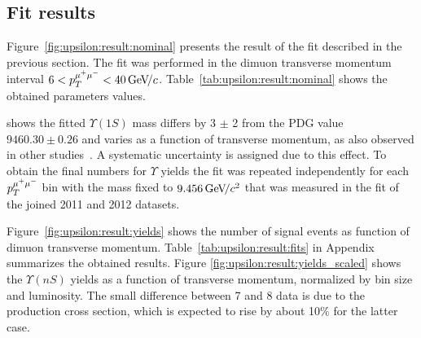\subsection{Fit results}
\label{sec:upsilon:result}

Figure~\ref{fig:upsilon:result:nominal} presents the result of the fit 
described in the previous section. The fit was performed in the dimuon
transverse momentum interval $ 6 < p_T^{{\mu^+\mu^-}} < 40 {\mathrm{\,Ge\kern -0.1em V\!/}c}$.
Table~\ref{tab:upsilon:result:nominal} shows the obtained parameters values. 







% 


 shows  the fitted $\Upsilon(1S)$
mass differs by 3 $\pm$ 2 \mevcc from the PDG value $9460.30 \pm  0.26$ \mevcc and
varies as a function of transverse momentum, as also observed in other
studies~\cite{Aaij:2013yaa}. A systematic uncertainty is assigned due to this
effect. To obtain the final numbers for $\Upsilon$ yields the fit was repeated
independently for each $p_T^{{\mu^+\mu^-}}$ bin with the \OneS mass fixed to
$9.456 {\mathrm{\,Ge\kern -0.1em V\!/}c^2}$ that was measured in the fit of the joined 2011 and 2012 datasets.

Figure~\ref{fig:upsilon:result:yields} shows the number of signal events as
function of dimuon transverse momentum. Table~\ref{tab:upsilon:result:fits} in
Appendix summarizes the obtained results. Figure
\ref{fig:upsilon:result:yields_scaled} shows the $\Upsilon(nS)$ yields as a
function of transverse momentum, normalized by bin size and luminosity. The
small difference between 7 and 8 \tev data is due to the production cross
section, which is expected to rise by about 10\% for the latter case.




